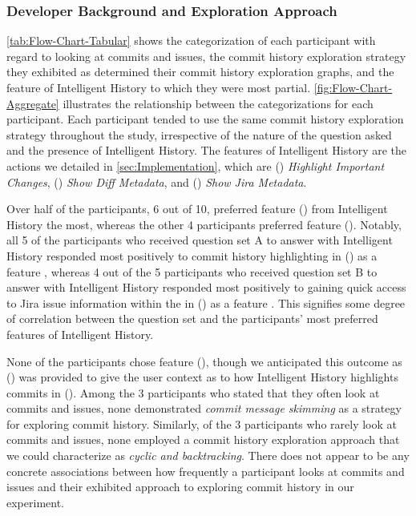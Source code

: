 \subsubsection{Developer Background and Exploration Approach}

\autoref{tab:Flow-Chart-Tabular} shows the categorization of each participant with regard to looking at commits and issues, 
the commit history exploration strategy they exhibited as determined  their commit history exploration graphs, 
and the feature of Intelligent History to which they were most partial.
\autoref{fig:Flow-Chart-Aggregate} illustrates the relationship between the categorizations for each participant.
Each participant tended to use the same commit history exploration strategy throughout the study, 
irrespective of the nature of the question asked and the presence of Intelligent History.
The features of Intelligent History are the actions we detailed in \autoref{sec:Implementation}, which are 
() \textit{Highlight Important Changes}, 
() \textit{Show Diff Metadata}, 
and () \textit{Show Jira Metadata}.

Over half of the participants, 6 out of 10, preferred feature () from Intelligent History the most,
whereas the other 4 participants preferred feature ().
Notably, all 5 of the participants who received question set A to answer with Intelligent History 
responded most positively to commit history highlighting in () as a feature , 
whereas 4 out of the 5 participants who received question set B to answer with Intelligent History 
responded most positively to gaining quick access to Jira issue information within the  in () as a feature .
This signifies some degree of correlation between the question set and the participants' most preferred features of Intelligent History.

None of the participants chose feature (), though we anticipated this outcome as () 
was provided to give the user context as to how Intelligent History highlights commits in ().
Among the 3 participants who stated that they often look at commits and issues, none demonstrated \textit{commit message skimming} 
as a strategy for exploring commit history.
Similarly, of the 3 participants who rarely look at commits and issues, none employed a commit history exploration approach 
that we could characterize as \textit{cyclic and backtracking}.
There does not appear to be any concrete associations between how frequently a participant looks at commits and issues
and their exhibited approach to exploring commit history in our experiment.

